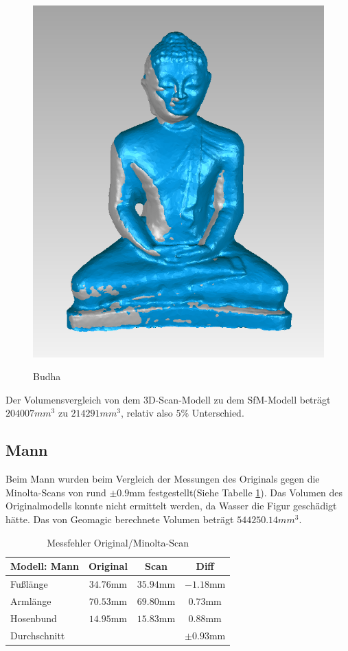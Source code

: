 \documentclass[]{article}
\begin{document}
\begin{figure}[H]
\caption{Budha}
\centering
\includegraphics[scale=0.4]{images/GeoMagicBudhaPictures/Budha_Merge_SfM_3DScan.PNG}
\label{fig:budhaMerge}
\end{figure}

Der Volumensvergleich von dem 3D-Scan-Modell zu dem SfM-Modell beträgt $204007 mm^3$ zu $214291 mm^3$, relativ also $5 \%$ Unterschied. 

\subsection{Mann}
Beim Mann wurden beim Vergleich der Messungen des Originals gegen die Minolta-Scans von rund $\pm 0.9$mm festgestellt(Siehe Tabelle \ref{tab:man:errorScan}). Das Volumen des Originalmodells konnte nicht ermittelt werden, da Wasser die Figur geschädigt hätte. Das von Geomagic berechnete Volumen beträgt $544250.14mm^3$.

\begin{table}[h!]
\centering
\begin{tabular}{l | c c | c}
Modell: Mann& Original & Scan & Diff\\
\hline
Fußlänge & $34.76$mm & $35.94$mm & $-1.18$mm\\
Armlänge & $70.53$mm & $69.80$mm & $0.73$mm\\
Hosenbund & $14.95$mm & $15.83$mm & $0.88$mm\\
\hline \hline
Durchschnitt & & & $\pm 0.93$mm
\end{tabular}
\caption{Messfehler Original/Minolta-Scan}
\label{tab:man:errorScan}
\end{table}
\end{document}
